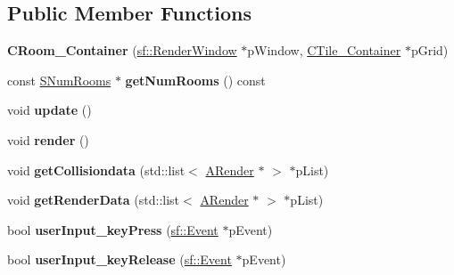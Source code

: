 \subsection*{Public Member Functions}
\begin{DoxyCompactItemize}
\item 
\hypertarget{classCRoom__Container_a3a1f638e223c661251d679d119a8a0c5}{{\bfseries C\-Room\-\_\-\-Container} (\hyperlink{classsf_1_1RenderWindow}{sf\-::\-Render\-Window} $\ast$p\-Window, \hyperlink{classCTile__Container}{C\-Tile\-\_\-\-Container} $\ast$p\-Grid)}\label{classCRoom__Container_a3a1f638e223c661251d679d119a8a0c5}

\item 
\hypertarget{classCRoom__Container_a4487394b5b73570abf3731200129e507}{const \hyperlink{structSNumRooms}{S\-Num\-Rooms} $\ast$ {\bfseries get\-Num\-Rooms} () const }\label{classCRoom__Container_a4487394b5b73570abf3731200129e507}

\item 
\hypertarget{classCRoom__Container_a976c43bd83d5416c3f3d286d09ebf89d}{void {\bfseries update} ()}\label{classCRoom__Container_a976c43bd83d5416c3f3d286d09ebf89d}

\item 
\hypertarget{classCRoom__Container_a170af863c917d336c1497fd031d79c6f}{void {\bfseries render} ()}\label{classCRoom__Container_a170af863c917d336c1497fd031d79c6f}

\item 
\hypertarget{classCRoom__Container_a8119bbe9405d6f151e8fd06e441e7eb5}{void {\bfseries get\-Collisiondata} (std\-::list$<$ \hyperlink{classARender}{A\-Render} $\ast$ $>$ $\ast$p\-List)}\label{classCRoom__Container_a8119bbe9405d6f151e8fd06e441e7eb5}

\item 
\hypertarget{classCRoom__Container_a96edd6800ff447f90fec9ae116eda34e}{void {\bfseries get\-Render\-Data} (std\-::list$<$ \hyperlink{classARender}{A\-Render} $\ast$ $>$ $\ast$p\-List)}\label{classCRoom__Container_a96edd6800ff447f90fec9ae116eda34e}

\item 
\hypertarget{classCRoom__Container_aa220dc3fd30384ef9d3b13b0f7c0a417}{bool {\bfseries user\-Input\-\_\-key\-Press} (\hyperlink{classsf_1_1Event}{sf\-::\-Event} $\ast$p\-Event)}\label{classCRoom__Container_aa220dc3fd30384ef9d3b13b0f7c0a417}

\item 
\hypertarget{classCRoom__Container_a85bb9fcebc84e71bb90fb5c7d7c201a6}{bool {\bfseries user\-Input\-\_\-key\-Release} (\hyperlink{classsf_1_1Event}{sf\-::\-Event} $\ast$p\-Event)}\label{classCRoom__Container_a85bb9fcebc84e71bb90fb5c7d7c201a6}


\end{DoxyCompactItemize}
